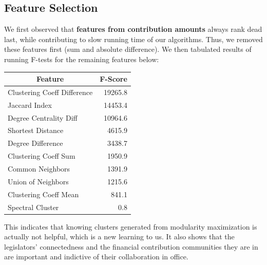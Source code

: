 \documentclass[12pt,twocolumn]{article}
\begin{document}
\subsection{Feature Selection}
We first observed that \textbf{features from contribution amounts} always rank dead last, while contributing to slow running time of our algorithms. Thus, we removed these features first (sum and absolute difference). We then tabulated results of running F-tests for the remaining features below: 

\begin{tabular}{|l|r|}
\hline
\multicolumn{1}{|c|}{Feature} & \multicolumn{1}{c|}{F-Score} \\ \hline
Clustering Coeff Difference   & 19265.8                \\ \hline
Jaccard Index                      & 14453.4                        \\ \hline
Degree Centrality Diff                    & 10964.6                        \\ \hline
Shortest Distance            & 4615.9                    \\ \hline
Degree Difference                 & 3438.7                        \\ \hline
Clustering Coeff Sum                & 1950.9                        \\ \hline
Common Neighbors            & 1391.9                        \\ \hline
Union of Neighbors             & 1215.6                     \\ \hline
Clustering Coeff Mean              &  841.1             \\ \hline
Spectral Cluster          & 0.8                      \\ \hline
\end{tabular}

This indicates that knowing clusters generated from modularity maximization is actually not helpful, which is a new learning to us. It also shows that the legislators' connectedness and the financial contribution communities they are in are important and indictive of their collaboration in office. 
\end{document}
